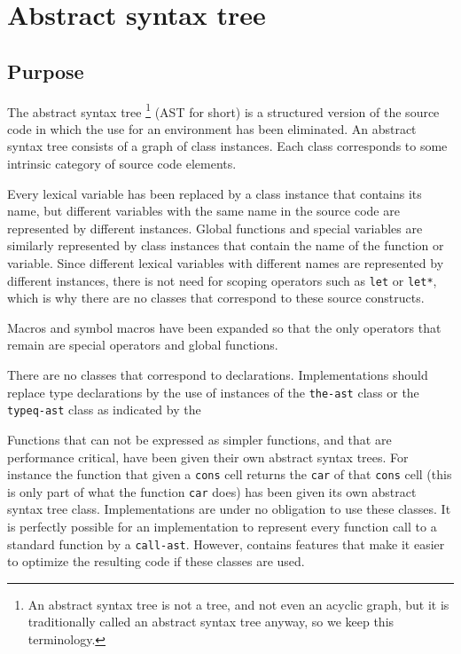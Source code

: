\chapter{Abstract syntax tree}
\label{chap-abstract-syntax-tree}

\section{Purpose}

The abstract syntax tree%
\footnote{An abstract syntax tree is not a tree, and not even an
  acyclic graph, but it is traditionally called an abstract syntax
  tree anyway, so we keep this terminology.}  (AST for short) is a
structured version of the source code in which the use for an
environment has been eliminated.  An abstract syntax tree consists of
a graph of class instances.  Each class corresponds to some intrinsic
category of source code elements.

Every lexical variable has been replaced by a class instance that
contains its name, but different variables with the same name in the
source code are represented by different instances.  Global functions
and special variables are similarly represented by class instances
that contain the name of the function or variable.  Since different
lexical variables with different names are represented by different
instances, there is not need for scoping operators such as
\texttt{let} or \texttt{let*}, which is why there are no classes that
correspond to these source constructs.  

Macros and symbol macros have been expanded so that the only operators
that remain are special operators and global functions.  

There are no classes that correspond to declarations.  Implementations
should replace type declarations by the use of instances of the
\texttt{the-ast} class or the \texttt{typeq-ast} class as indicated by
the \hs{}

Functions that can not be expressed as simpler functions, and that are
performance critical, have been given their own abstract syntax trees.
For instance the function that given a \texttt{cons} cell returns the
\texttt{car} of that \texttt{cons} cell (this is only part of what the
\cl{} function \texttt{car} does) has been given its own abstract
syntax tree class.  Implementations are under no obligation to use
these classes.  It is perfectly possible for an implementation to
represent every function call to a standard \cl{} function by a
\texttt{call-ast}.  However, \sysname{} contains features that make it
easier to optimize the resulting code if these classes are used.

